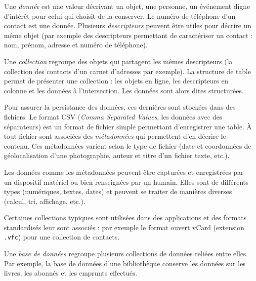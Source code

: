 \begin{tcolorbox}[title={Données et information}, toprule=0pt, leftrule=0pt, rightrule=0pt, arc=0pt,
                  fonttitle=\scshape\boxtitlefont,
                  colbacktitle=white, coltitle=firstcolor, colframe=firstcolor, colback=firstcolor!10,
                  breakable, enhanced jigsaw]


Une \emph{donnée} est une valeur décrivant un objet, une personne, un événement digne d’intérêt pour celui qui choisit de la conserver. Le numéro de téléphone d’un contact est une donnée. Plusieurs \emph{descripteurs} peuvent être utiles pour décrire un même objet (par exemple des descripteurs permettant de caractériser un contact : nom, prénom, adresse et numéro de téléphone).

Une \emph{collection} regroupe des objets qui partagent les mêmes descripteurs (la collection des contacts d’un carnet d’adresses par exemple). La structure de table permet de présenter une collection : les objets en ligne, les descripteurs en colonne et les données à l’intersection. Les données sont alors dites structurées.

Pour assurer la persistance des données, ces dernières sont stockées dans des fichiers. Le format CSV (\textit{Comma Separated Values}, les données avec des séparateurs) est un format de fichier simple permettant d’enregistrer une table. À tout fichier sont associées des \emph{métadonnées} qui permettent d’en décrire le contenu. Ces métadonnées varient selon le type de fichier (date et coordonnées de géolocalisation d’une photographie, auteur et titre d’un fichier texte, etc.).

Les données comme les métadonnées peuvent être capturées et enregistrées par un dispositif matériel ou bien renseignées par un humain. Elles sont de différents types (numériques, textes, dates) et peuvent se traiter de manières diverses (calcul, tri, affichage, etc.).

Certaines collections typiques sont utilisées dans des applications et des formats standardisés leur sont associés : par exemple le format ouvert vCard (extension \texttt{.vfc}) pour une collection de contacts.

Une \emph{base de données} regroupe plusieurs collections de données reliées entre elles. Par exemple, la base de données d’une bibliothèque conserve les données sur les livres, les abonnés et les emprunts effectués.
\end{tcolorbox}



